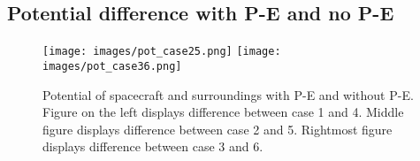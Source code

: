 \subsection{Potential difference with P-E and no P-E}

    \begin{figure}
        \texttt{[image: images/pot\_case25.png]}
        \texttt{[image: images/pot\_case36.png]}
        \caption{Potential of spacecraft and surroundings with P-E and without P-E. Figure on the left displays difference between case 1 and 4. Middle figure displays difference between case 2 and 5. Rightmost figure displays difference between case 3 and 6.}
    \end{figure}
